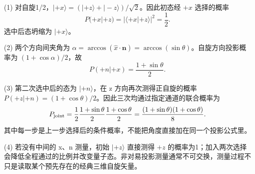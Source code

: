 (1) 对自旋1/2，\(|+x\rangle=(|+z\rangle+|-z\rangle)/\sqrt2\)。因此初态经 \(+x\) 选择的概率
\[
P(+x|+z)=|\langle+x|+z\rangle|^2=\frac12.
\]
选中后态坍缩为 \(|+x\rangle\)。

(2) 两个方向间夹角为 \(\alpha=\arccos(\hat x\cdot\boldsymbol n)=\arccos(\sin\theta)\)。自旋方向投影概率为 \((1+\cos\alpha)/2\)，故
\[
P(+n|+x)=\frac{1+\sin\theta}{2}.
\]

(3) 第二次选中后的态为 \(|+n\rangle\)，在 z 方向再次测得正自旋的概率 \(P(+z|+n)=(1+\cos\theta)/2\)。因此三次均通过指定通道的联合概率为
\[
P_{\rm joint}=\frac12\frac{1+\sin\theta}{2}\frac{1+\cos\theta}{2}
=\frac{(1+\sin\theta)(1+\cos\theta)}8.
\]
其中每一步是上一步选择后的条件概率，不能把角度直接加在同一个投影公式里。

(4) 若没有中间的 x、n 测量，初始 \(|+z\rangle\) 直接测得 \(+z\) 的概率为1；加入两次选择会降低全程通过的比例并改变量子态。非对易投影测量通常不可交换，测量过程不只是读取某个预先存在的经典三维自旋矢量。
